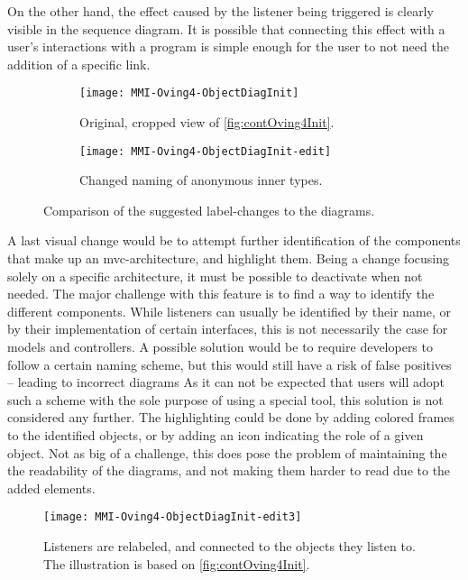 On the other hand, the effect caused by the listener being triggered is clearly visible in the sequence diagram.
It is possible that connecting this effect with a user's interactions with a program is simple enough for the user to not need the addition of a specific link.

\begin{figure}[H]
	\centering
	\begin{subfigure}{\textwidth}
		\centering
		\texttt{[image: MMI-Oving4-ObjectDiagInit]}
		\caption{Original, cropped view of \cref{fig:contOving4Init}.}
		\label{fig:contOving4ChangesLabA}
	\end{subfigure}
	\begin{subfigure}{\textwidth}
		\centering
		\texttt{[image: MMI-Oving4-ObjectDiagInit-edit]}
		\caption{Changed naming of anonymous inner types.}
		\label{fig:contOving4ChangesLabB}
	\end{subfigure}
	\caption{Comparison of the suggested label-changes to the diagrams.}
	\label{fig:contOving4ChangesLab}
\end{figure}

A last visual change would be to attempt further identification of the components that make up an \gls{mvc}-architecture, and highlight them.
Being a change focusing solely on a specific architecture, it must be possible to deactivate when not needed.
The major challenge with this feature is to find a way to identify the different components.
While listeners can usually be identified by their name, or by their implementation of certain interfaces, this is not necessarily the case for models and controllers.
A possible solution would be to require developers to follow a certain naming scheme, but this would still have a risk of false positives -- leading to incorrect diagrams
As it can not be expected that users will adopt such a scheme with the sole purpose of using a special tool, this solution is not considered any further.
The highlighting could be done by adding colored frames to the identified objects, or by adding an icon indicating the role of a given object.
Not as big of a challenge, this does pose the problem of maintaining the the readability of the diagrams, and not making them harder to read due to the added elements.

\begin{figure}[H]
	\centering
	\texttt{[image: MMI-Oving4-ObjectDiagInit-edit3]}
	\caption{Listeners are relabeled, and connected to the objects they listen to. The illustration is based on \cref{fig:contOving4Init}.}
	\label{fig:contOving4ChangesLink}
\end{figure}

